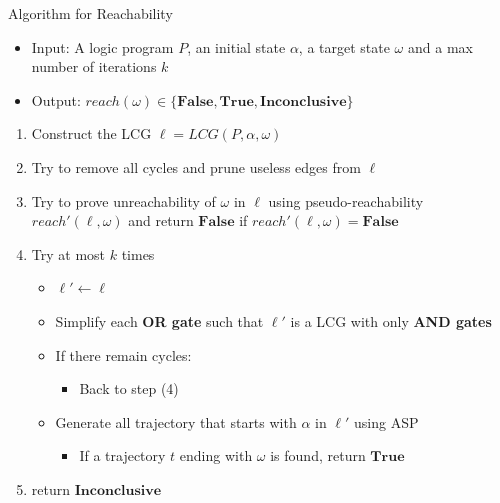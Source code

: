 \documentclass[8pt]{beamer}
\begin{document}
\begin{frame}{Algorithm for Reachability}
\begin{itemize}
    \item Input: A logic program $P$, an initial state $\alpha$, a target state $\omega$ and a max number of iterations $k$
    \item Output: $reach(\omega)\in\{\mathbf{False},\mathbf{True},\mathbf{Inconclusive}\}$
\end{itemize}
\begin{enumerate}
    \item Construct the LCG $\ell=LCG(P,\alpha,\omega)$
    \item Try to remove all cycles and prune useless edges from $\ell$
    \item Try to prove unreachability of $\omega$ in $\ell$ using pseudo-reachability $reach'(\ell,\omega)$ and return $\mathbf{False}$ if $reach'(\ell,\omega)=\textbf{False}$
    \item Try at most $k$ times
    \begin{itemize}
    \item $\ell'\gets \ell$
    \item Simplify each \textbf{OR gate} such that $\ell'$ is a LCG with only \textbf{AND gates}
    \item If there remain cycles:
        \begin{itemize}
            \item Back to step (4)
        \end{itemize}
    \item Generate all trajectory that starts with $\alpha$ in $\ell'$ using ASP
    \begin{itemize}
        \item If a trajectory $t$ ending with $\omega$ is found, return $\mathbf{True}$
    \end{itemize}
    \end{itemize}
    \item return $\mathbf{Inconclusive}$
\end{enumerate}


\end{frame}

%
%
\end{document}
